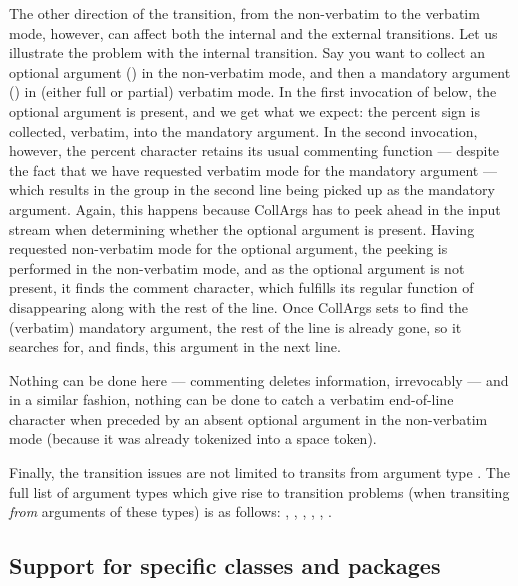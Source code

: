 \documentclass[a4paper,11pt]{article}
\begin{document}
The other direction of the transition, from the non-verbatim to the verbatim
mode, however, can affect both the internal and the external transitions.  Let
us illustrate the problem with the internal transition.  Say you want to
collect an optional argument () in the non-verbatim mode, and
then a mandatory argument () in (either full or partial)
verbatim mode.  In the first invocation of  below, the
optional argument is present, and we get what we expect: the percent sign is
collected, verbatim, into the mandatory argument.  In the second invocation,
however, the percent character retains its usual commenting function ---
despite the fact that we have requested verbatim mode for the mandatory
argument --- which results in the group in the second line being picked up as
the mandatory argument.  Again, this happens because CollArgs has to peek ahead
in the input stream when determining whether the optional argument is present.
Having requested non-verbatim mode for the optional argument, the peeking is
performed in the non-verbatim mode, and as the optional argument is not
present, it finds the comment character, which fulfills its regular function of
disappearing along with the rest of the line.  Once CollArgs sets to find the
(verbatim) mandatory argument, the rest of the line is already gone, so it
searches for, and finds, this argument in the next line.

\long{}

Nothing can be done here --- commenting deletes information, irrevocably ---
and in a similar fashion, nothing can be done to catch a verbatim end-of-line
character when preceded by an absent optional argument in the non-verbatim mode
(because it was already tokenized into a space token).

Finally, the transition issues are not limited to transits from argument type
.  The full list of argument types which give rise to
transition problems (when transiting \emph{from} arguments of these types) is
as follows: , , ,
, , .


\endgroup %


\subsection{Support for specific classes and packages}
\end{document}
